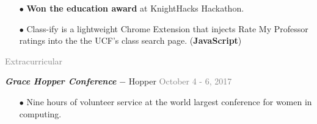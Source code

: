 \documentclass[11pt]{article}
\newcommand{\rsection}[1]{\vspace{1.5em}\textcolor{gray}{\Large \robotoslab #1}\vspace{0.5em}}
\newcommand{\bt}[1]{\textit{\textbf{#1}}} %
\newcommand{\dash}[0]{ $-$ } %
\newcommand{\gray}[1]{\textcolor{gray}{#1}}
\begin{document}
\begin{itemize}
\item[$\bullet$] \textbf{Won the education award} at KnightHacks Hackathon.
\item[$\bullet$] Class-ify is a lightweight Chrome Extension that injects Rate My Professor ratings into the the UCF's class search page. (\textbf{JavaScript})
\end{itemize}

\rsection{Extracurricular}

\bt{Grace Hopper Conference}\dash Hopper \hfill \gray{October 4 - 6, 2017}

\begin{itemize}
\item[$\bullet$] Nine hours of volunteer service at the world largest conference for women in computing.
\end{itemize}
\end{document}
